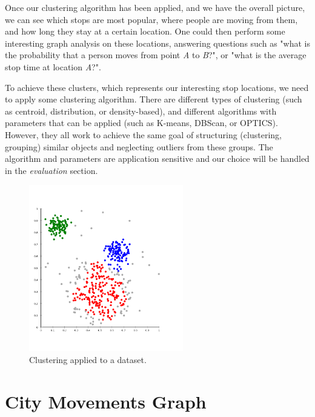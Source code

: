  Once our clustering algorithm has been applied, and we have the overall picture, we can see which stops are most popular, where people are moving from them, and how long they stay at a certain location. One could then perform some interesting graph analysis on these locations, answering questions such as "what is the probability that a person moves from point \textit{A} to \textit{B}?", or "what is the average stop time at location \textit{A}?". 
 
 To achieve these clusters, which represents our interesting stop locations, we need to apply some clustering algorithm. There are different types of clustering (such as centroid, distribution, or density-based), and different algorithms with parameters that can be applied (such as K-means, DBScan, or OPTICS). However, they all work to achieve the same goal of structuring (clustering, grouping) similar objects and neglecting outliers from these groups. The algorithm and parameters are application sensitive and our choice will be handled in the \textit{evaluation} section.

\begin{figure}[!ht]
	\centering
	\includegraphics[width=0.6\textwidth]{images/clustering.png}
	\caption{ Clustering applied to a dataset. }
	\label{fig:clustering}
\end{figure} 

\FloatBarrier
\section{City Movements Graph}

\FloatBarrier
